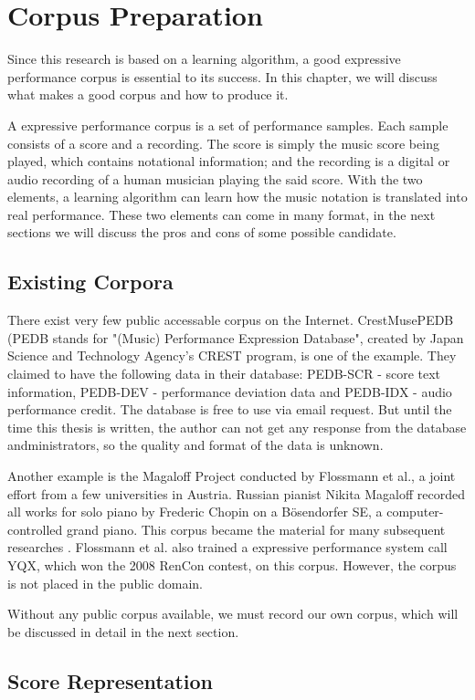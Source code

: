 \chapter{Corpus Preparation}
Since this research is based on a learning algorithm, a good expressive performance corpus is essential to its success. In this chapter, we will discuss what makes a good corpus and how to produce it. 

A expressive performance corpus is a set of performance samples. Each sample consists of a score and a recording. The score is simply the music score being played, which contains notational information; and the recording is a digital or audio recording of a human musician playing the said score. With the two elements, a learning algorithm can learn how the music notation is translated into real performance. These two elements can come in many format, in the next sections we will discuss the pros and cons of some possible candidate.
\section{Existing Corpora} 
There exist very few public accessable corpus on the Internet. CrestMusePEDB\cite{crestmuse} (PEDB stands for "(Music) Performance Expression Database", created by Japan Science and Technology Agency's CREST program, is one of the example. They claimed to have the following data in their database: PEDB-SCR - score text information, PEDB-DEV - performance deviation data and PEDB-IDX - audio performance credit. The database is free to use via email request. But until the time this thesis is written, the author can not get any response from the database andministrators, so the quality and format of the data is unknown.

Another example is the Magaloff Project\cite{magaloff} conducted by Flossmann et al., a joint effort from a few universities in Austria.  Russian pianist Nikita Magaloff recorded all works for solo piano by Frederic Chopin on a Bösendorfer SE, a computer-controlled grand piano. This corpus became the material for many subsequent researches \cite{magaloff extendedi}. Flossmann et al. also trained a expressive performance system call YQX\cite{yqx}, which won the 2008 RenCon contest, on this corpus. However, the corpus is not placed in the public domain. 

Without any public corpus available, we must record our own corpus, which will be discussed in detail in the next section.


\section{Score Representation}


